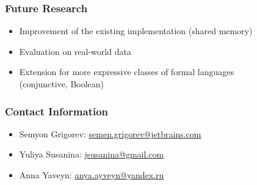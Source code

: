 \documentclass[xcolor=table]{beamer}
\begin{document}
\begin{frame}[fragile] \frametitle{Future Research}
    \begin{itemize}
        \item Improvement of the existing implementation (shared memory)
        \item Evaluation on real-world data
        \item Extension for more expressive classes of formal languages \\ (conjunctive,  Boolean)
    \end{itemize}
\end{frame}


\begin{frame}
\frametitle{Contact Information}
\begin{itemize}
  \item Semyon Grigorev: \href{mailto:semyon.grigorev@jetbrains.com}{semen.grigorev@jetbrains.com}
  \item Yuliya Susanina: \href{mailto:jsusanina@gmail.com}{jsusanina@gmail.com}
  \item Anna Yaveyn: \href{mailto:anya.ayveyn@yandex.ru}{anya.ayveyn@yandex.ru}
\end{itemize}
\vspace{0.1cm}
\end{frame}
\end{document}
